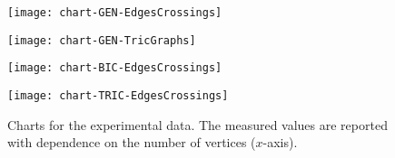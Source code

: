 \documentclass{article}
\begin{document}
 \begin{figure}[t]
    \centering
    \begin{minipage}[b]{.49\textwidth}
    	\centering
    	\texttt{[image: chart-GEN-EdgesCrossings]}
    	\label{ch:chart-GEN-EdgesCrossings}
    \end{minipage}
    \begin{minipage}[b]{.49\textwidth}
    	\centering
    	\texttt{[image: chart-GEN-TricGraphs]}
    	\label{ch:chart-GEN-TricGraphs}
    \end{minipage}
    \begin{minipage}[b]{.49\textwidth}
    	\centering
    	\texttt{[image: chart-BIC-EdgesCrossings]}
    	\label{ch:chart-BIC-EdgesCrossings}
    \end{minipage}   
    \begin{minipage}[b]{.49\textwidth}
    	\centering
    	\texttt{[image: chart-TRIC-EdgesCrossings]}
    	\label{ch:chart-TRIC-EdgesCrossings}
    \end{minipage}  
    \caption{Charts for the experimental data. The measured values are reported with dependence on the number of vertices ($x$-axis).}\label{ch:additional}
\end{figure} 
\end{document}
